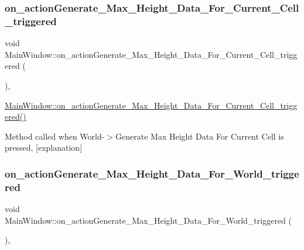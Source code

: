 \subsubsection{\texorpdfstring{on\+\_\+action\+Generate\+\_\+\+Max\+\_\+\+Height\+\_\+\+Data\+\_\+\+For\+\_\+\+Current\+\_\+\+Cell\+\_\+triggered}{on\_actionGenerate\_Max\_Height\_Data\_For\_Current\_Cell\_triggered}}
{\footnotesize\ttfamily void Main\+Window\+::on\+\_\+action\+Generate\+\_\+\+Max\+\_\+\+Height\+\_\+\+Data\+\_\+\+For\+\_\+\+Current\+\_\+\+Cell\+\_\+triggered (\begin{DoxyParamCaption}{ }\end{DoxyParamCaption})\hspace{0.3cm}{\ttfamily [private]}, {\ttfamily [slot]}}



\hyperlink{class_main_window_abdad9bfc636dbe25f777c4c822ef9c37}{Main\+Window\+::on\+\_\+action\+Generate\+\_\+\+Max\+\_\+\+Height\+\_\+\+Data\+\_\+\+For\+\_\+\+Current\+\_\+\+Cell\+\_\+triggered()} 

Method called when World-\/$>$Generate Max Height Data For Current Cell is pressed, \mbox{[}explanation\mbox{]} \mbox{\label{class_main_window_af239e60413e6c76eb2dcf61cb088e30a}} 
\subsubsection{\texorpdfstring{on\+\_\+action\+Generate\+\_\+\+Max\+\_\+\+Height\+\_\+\+Data\+\_\+\+For\+\_\+\+World\+\_\+triggered}{on\_actionGenerate\_Max\_Height\_Data\_For\_World\_triggered}}
{\footnotesize\ttfamily void Main\+Window\+::on\+\_\+action\+Generate\+\_\+\+Max\+\_\+\+Height\+\_\+\+Data\+\_\+\+For\+\_\+\+World\+\_\+triggered (\begin{DoxyParamCaption}{ }\end{DoxyParamCaption})\hspace{0.3cm}{\ttfamily [private]}, {\ttfamily [slot]}}



